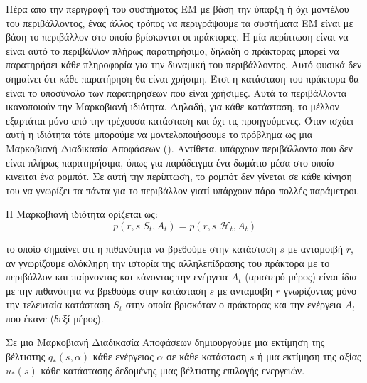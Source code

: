 Πέρα απο την περιγραφή του συστήματος ΕΜ με βάση την ύπαρξη ή όχι μοντέλου του περιβάλλοντος, ένας
άλλος τρόπος να περιγράψουμε τα συστήματα ΕΜ είναι με βάση το περιβάλλον στο οποίο βρίσκονται οι
πράκτορες. Η μία περίπτωση είναι να είναι αυτό το περιβάλλον πλήρως παρατηρήσιμο,
δηλαδή ο πράκτορας μπορεί να παρατηρήσει κάθε πληροφορία για την δυναμική του περιβάλλοντος.
Αυτό φυσικά δεν σημαίνει ότι κάθε παρατήρηση θα είναι χρήσιμη. Έτσι η κατάσταση
του πράκτορα θα είναι το υποσύνολο των παρατηρήσεων που είναι χρήσιμες. Αυτά τα
περιβάλλοντα ικανοποιούν την Μαρκοβιανή ιδιότητα. Δηλαδή, για κάθε κατάσταση, το μέλλον εξαρτάται μόνο από
την τρέχουσα κατάσταση και όχι τις προηγούμενες. Όταν ισχύει αυτή η ιδιότητα τότε μπορούμε να μοντελοποιήσουμε το πρόβλημα ως μια
Μαρκοβιανή Διαδικασία Αποφάσεων (). Αντίθετα, υπάρχουν περιβάλλοντα που δεν είναι πλήρως
παρατηρήσιμα, όπως για παράδειγμα ένα δωμάτιο μέσα στο οποίο κινειται ένα ρομπότ. Σε αυτή την περίπτωση,
το ρομπότ δεν γίνεται σε κάθε κίνηση του να γνωρίζει τα πάντα για το περιβάλλον γιατί υπάρχουν πάρα πολλές παράμετροι.


Η Μαρκοβιανή ιδιότητα ορίζεται ως:
\begin{equation}
    p(r,s|S_t, A_t) = p(r,s | \mathcal{H}_t, A_t)
\end{equation}

το οποίο σημαίνει ότι η πιθανότητα να βρεθούμε στην κατάσταση $s$ με ανταμοιβή $r$, αν γνωρίζουμε
ολόκληρη την ιστορία της αλληλεπίδρασης του πράκτορα με το περιβάλλον και παίρνοντας και κάνοντας
την ενέργεια $A_t$ (αριστερό μέρος) είναι ίδια με την πιθανότητα να βρεθούμε στην κατάσταση $s$ με
ανταμοιβή $r$ γνωρίζοντας μόνο την τελευταία κατάσταση $S_t$ στην οποία βρισκόταν ο πράκτορας
και την ενέργεια $A_t$ που έκανε (δεξί μέρος).

Σε μια Μαρκοβιανή Διαδικασία Αποφάσεων δημιουργούμε μια εκτίμηση της βέλτιστης $q_*(s,α)$ κάθε
ενέργειας $α$ σε κάθε κατάσταση $s$ ή μια εκτίμηση της αξίας $u_*(s)$ κάθε κατάστασης δεδομένης
μιας βέλτιστης επιλογής ενεργειών.

